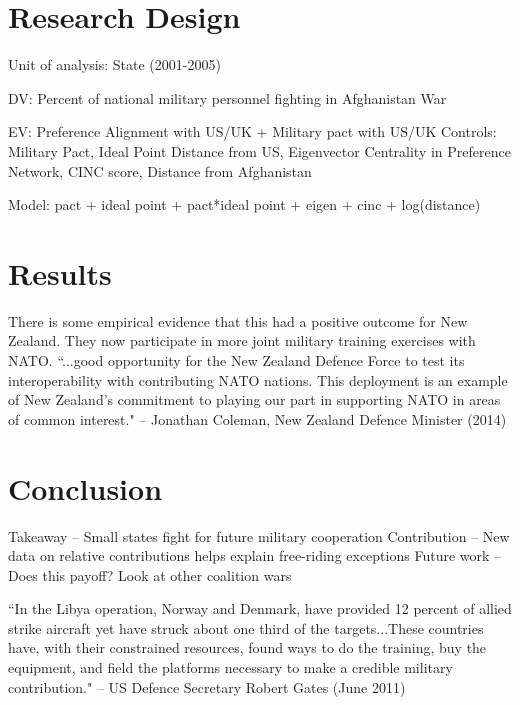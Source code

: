 \documentclass[12pt,letterpaper]{article}
\begin{document}
\section{Research Design}
	Unit of analysis: State (2001-2005)
	
	DV: Percent of national military personnel fighting in Afghanistan War
	
	EV: Preference Alignment with US/UK + Military pact with US/UK
	Controls: Military Pact, Ideal Point Distance from US,  Eigenvector Centrality in Preference Network, CINC score, Distance from Afghanistan
	
	Model: pact + ideal point + pact*ideal point + eigen + cinc + log(distance)

\section{Results}
	There is some empirical evidence that this had a positive outcome for New Zealand. They now participate in more joint military training exercises with NATO. ``...good opportunity for the New Zealand Defence Force to test its interoperability with contributing NATO nations. This deployment is an example of New Zealand's commitment to playing our part in supporting NATO in areas of common interest." -- Jonathan Coleman, New Zealand Defence Minister (2014)

\section{Conclusion}
	Takeaway -- Small states fight for future military cooperation
	Contribution -- New data on relative contributions helps explain free-riding exceptions
	Future work -- Does this payoff? Look at other coalition wars
	
	``In the Libya operation, Norway and Denmark, have provided 12 percent of allied strike aircraft yet have struck about one third of the targets...These countries have, with their constrained resources, found ways to do the training, buy the equipment, and field the platforms necessary to make a credible military contribution." -- US Defence Secretary Robert Gates (June 2011)



\end{document}
